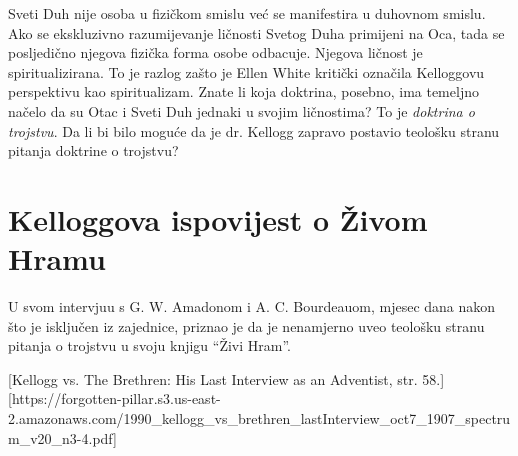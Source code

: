 Sveti Duh nije osoba u fizičkom smislu već se manifestira u duhovnom smislu. Ako se ekskluzivno razumijevanje ličnosti Svetog Duha primijeni na Oca, tada se posljedično njegova fizička forma osobe odbacuje. Njegova ličnost je spiritualizirana. To je razlog zašto je Ellen White kritički označila Kelloggovu perspektivu kao spiritualizam. Znate li koja doktrina, posebno, ima temeljno načelo da su Otac i Sveti Duh jednaki u svojim ličnostima? To je \textit{doktrina o trojstvu}. Da li bi bilo moguće da je dr. Kellogg zapravo postavio teološku stranu pitanja doktrine o trojstvu?

\section*{Kelloggova ispovijest o Živom Hramu}

U svom intervjuu s G. W. Amadonom i A. C. Bourdeauom, mjesec dana nakon što je isključen iz zajednice, priznao je da je nenamjerno uveo teološku stranu pitanja o trojstvu u svoju knjigu “Živi Hram”.

[Kellogg vs. The Brethren: His Last Interview as an Adventist, str. 58.][https://forgotten-pillar.s3.us-east-2.amazonaws.com/1990\_kellogg\_vs\_brethren\_lastInterview\_oct7\_1907\_spectrum\_v20\_n3-4.pdf]

